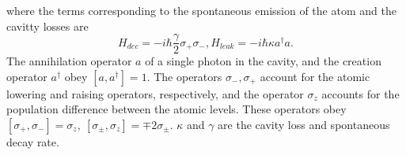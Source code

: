 \documentclass[conference]{IEEEtran}
\begin{document}
where the terms corresponding to the spontaneous emission of the atom and the cavitty losses are
\begin{subequations}
\begin{equation}
H_{dec} = - i\hbar\frac{\gamma}{2}\sigma_+\sigma_-,
\end{equation}
\begin{equation}
H_{leak} = - i\hbar\kappa a^\dagger a.
\end{equation}
\end{subequations}
The annihilation operator $a$ of a single photon in the cavity, and the creation operator $a^\dagger$ obey $[a, a^\dagger] = 1$. The operators $\sigma_-, \sigma_+$  account for the atomic lowering and raising operators, respectively, and the operator $\sigma_z$ accounts for the population difference between the atomic levels. These operators obey $[\sigma_+, \sigma_-] = \sigma_z, \ [\sigma_\pm, \sigma_z] = \mp 2\sigma_\pm$. $\kappa$ and $\gamma$ are the cavity loss and spontaneous decay rate.\\ %

\end{document}
